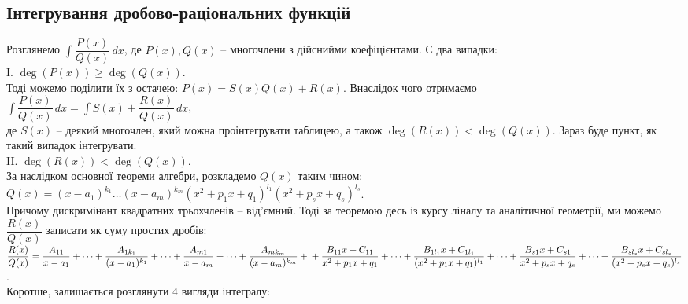 \documentclass[a4paper, 10pt]{article}
\def\huge{\displaystyle}
\theoremstyle{theoremdd}
\theoremstyle{theoremdd}
\theoremstyle{theoremdd}
\theoremstyle{theoremdd}
\theoremstyle{theoremdd}
\theoremstyle{theoremdd}
\theoremstyle{theoremdd}
\theoremstyle{theoremdd}
\theoremstyle{theoremdd}
\begin{document}
\subsection{Інтегрування дробово-раціональних функцій}
Розглянемо $\huge \int \dfrac{P(x)}{Q(x)}\,dx$, де $P(x), Q(x)$ -- многочлени з дійснийми коефіцієнтами. Є два випадки:\\
I. \textit{$\deg(P(x)) \geq \deg(Q(x))$}.\\
Тоді можемо поділити їх з остачею: $P(x) = S(x)Q(x) + R(x)$. Внаслідок чого отримаємо \\ $\huge \int \dfrac{P(x)}{Q(x)}\,dx = \int S(x) + \dfrac{R(x)}{Q(x)}\,dx$,\\
де $S(x)$ -- деякий многочлен, який можна проінтегрувати таблицею, а також $\deg(R(x)) < \deg(Q(x))$. Зараз буде пункт, як такий випадок інтегрувати.
\bigskip \\
II. \textit{$\deg(R(x)) < \deg(Q(x))$}.\\
За наслідком основної теореми алгебри, розкладемо $Q(x)$ таким чином: \\
$Q(x) = (x-a_1)^{k_1} \dots (x-a_m)^{k_m} (x^2+p_1x+q_1)^{l_1} (x^2+p_sx+q_s)^{l_s}$. \\
Причому дискримінант квадратних трьохчленів -- від'ємний. Тоді за теоремою десь із курсу ліналу та аналітичної геометрії, ми можемо $\dfrac{R(x)}{Q(x)}$ записати як суму простих дробів:\\
$\dfrac{R(x)}{Q(x)} = \dfrac{A_{11}}{x-a_1} + \dots + \dfrac{A_{1k_1}}{(x-a_1)^{k_1}}+ \dots + \dfrac{A_{m1}}{x-a_m} + \dots + \dfrac{A_{mk_m}}{(x-a_m)^{k_m}} + \\
+ \dfrac{B_{11}x + C_{11}}{x^2+p_1x+q_1} + \dots + \dfrac{B_{1l_1}x + C_{1l_1}}{(x^2+p_1x+q_1)^{l_1}} + \dots + \dfrac{B_{s1}x + C_{s1}}{x^2+p_sx+q_s} + \dots + \dfrac{B_{sl_s}x + C_{sl_s}}{(x^2+p_sx+q_s)^{l_s}}$.\\
Коротше, залишається розглянути 4 вигляди інтегралу:
\end{document}
